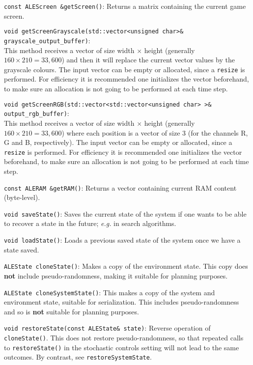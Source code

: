 \documentclass[12pt]{article}
\begin{document}
  \verb+const ALEScreen &getScreen()+: Returns a matrix containing the current game screen.
  
  \verb+void getScreenGrayscale(std::vector<unsigned char>& grayscale_output_buffer)+: \\
  This method receives a vector of size width $\times$ height (generally $160 \times 210
  = 33,600$) and then it will replace the current vector values by the grayscale colours. 
  The input vector can be empty or allocated, since a \verb+resize+ is performed. For efficiency
  it is recommended one initializes the vector beforehand, to make sure an allocation is not
  going to be performed at each time step.
  
  \verb+void getScreenRGB(std::vector<std::vector<unsigned char> >& output_rgb_buffer)+:\\ 
  This method receives a vector of size width $\times$ height (generally $160 \times 210
  = 33,600$) where each position is a vector of size 3 (for the channels R, G and B, respectively).
  The input vector can be empty or allocated, since a \verb+resize+ is performed. For efficiency
  it is recommended one initializes the vector beforehand, to make sure an allocation is not
  going to be performed at each time step.
 
  \verb+const ALERAM &getRAM()+: Returns a vector containing current RAM content (byte-level).
  
  \verb+void saveState()+: Saves the current state of the system if one wants to be able to recover 
  a state in the future; \emph{e.g.} in search algorithms.
  
  \verb+void loadState()+: Loads a previous saved state of the system once we have a state saved.

  \verb+ALEState cloneState()+: Makes a copy of the environment state. This copy does \textbf{not}
  include pseudo-randomness, making it suitable for planning purposes.

  \verb+ALEState cloneSystemState()+:  This makes a copy of the system and environment state,
  suitable for serialization. This includes pseudo-randomness and so is \textbf{not} suitable for planning
  purposes.

  \verb+void restoreState(const ALEState& state)+:  Reverse operation of \verb+cloneState()+. This does not
  restore pseudo-randomness, so that repeated calls to \verb+restoreState()+ in the stochastic controls setting
  will not lead to the same outcomes. By contrast, see \verb+restoreSystemState+.
\end{document}
